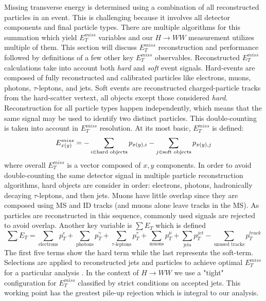 Missing transverse energy is determined using a combination of all reconstructed particles in an event. This is challenging because it involves all detector components and final particle types. There are multiple algorithms for this summation which yield $E_T^{miss}$ variables and our $H\rightarrow WW$ measurement utilizes multiple of them. This section will discuss $E_T^{miss}$ reconstruction and performance followed by definitions of a few other key $E_T^{miss}$ observables. 
Reconstructed $E_T^{miss}$ calculations take into account both \textit{hard} and \textit{soft} event signals. Hard-events are composed of fully reconstructed and calibrated particles like electrons, muons, photons, $\tau$-leptons, and jets. Soft events are reconstructed charged-particle tracks from the hard-scatter vertext, all objects except those considered \textit{hard}. Reconstruction for all particle types happen independently, which means that the same signal may be used to identify two distinct particles. This double-counting is taken into account in $E_T^{miss}$ resolution. At its most basic, $E_T^{miss}$ is defined:
\begin{equation}
E_{x(y)}^{miss}=-\sum_{i\in{\textnormal{hard objects}}}p_{x(y),i} -\sum_{j\in{\textnormal{soft objects}}}p_{x(y),j}
\end{equation}
where overall $E_T^{miss}$ is a vector composed of $x,y$ components. In order to avoid double-counting the same detector signal in multiple particle reconstruction algorithms, hard objects are consider in order: electrons, photons, hadronically decaying $\tau$-leptons, and then jets. Muons have little overlap since they are composed using MS and ID tracks (and muons alone leave tracks in the MS). As particles are reconstructed in this sequence, commonly used signals are rejected to avoid overlap. Another key variable is $\sum E_T$ which is defined
\begin{equation}
\sum E_T = \sum_{\text{electrons}} p_T^e + \sum_{\text{photons}} p_T^\gamma + \sum_{\text{$\tau$-leptons}} p_T^\tau + \sum_{\text{muons}} p_T^\mu + \sum_{\text{jets}} p_T^{jet} - \sum_{\text{unused tracks}} p_T^{track}
\end{equation}
The first five terms show the hard term while the last represents the soft-term. Selections are applied to reconstructed jets and particles to achieve optimal $E_T^{miss}$ for a particular analysis \cite{METPerf}. In the context of $H\rightarrow WW$ we use a "tight" configuration for $E_T^{miss}$ classified by strict conditions on accepted jets. This working point has the greatest pile-up rejection which is integral to our analysis. 

